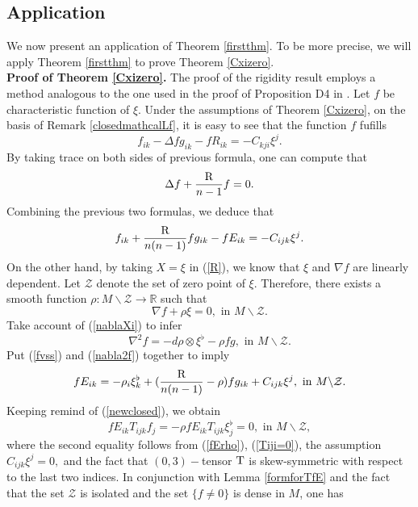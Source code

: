 \documentclass[10pt,leqno,oneside]{amsart}
\begin{document}
{   \subsection{Application}
          We now present an application of Theorem \ref{firstthm}. To be more precise, we will apply Theorem \ref{firstthm} to prove Theorem \ref{Cxizero}.\\
    {\bf Proof of Theorem \ref{Cxizero}.}
         The proof of the rigidity result employs a method analogous to the one used in the proof of Proposition D4 in \cite{Lafontaine1983}. Let $f$ be characteristic function of $\xi.$ Under the assumptions of Theorem \ref{Cxizero}, on the basis of Remark \ref{closedmathcalLf}, it is easy to see that the function $f$ fufills
         \[f_{ik}-\Delta f g_{ik}-f R_{ik}=-C_{kji}\xi^j.\]
         By taking trace on both sides of previous formula, one can compute that
         \[\Delta f+\frac{\rm{R}}{n-1}f=0.\]
         Combining the previous two formulas, we deduce that
         \begin{equation}\label{fvss}
           f_{ik}+  \frac{\rm{R}}{n(n-1)}fg_{ik}-f E_{ik}=-C_{ijk}\xi^j.
         \end{equation}
         On the other hand, by taking $X=\xi$ in (\ref{R}), we know that $\xi$ and $\nabla f$ are linearly dependent. Let $\mathcal{Z}$ denote the set of zero point of $\xi.$ Therefore, there exists a smooth function $\rho:M\backslash \mathcal{Z}\rightarrow\mathbb R$ such that
         \begin{equation}\label{newclosed}
                       \nabla f+\rho\xi=0,\text{~in~} M\backslash \mathcal{Z}.
         \end{equation}
         Take account of (\ref{nablaXi}) to infer
         \begin{equation}\label{nabla2f}
           \nabla^2f=-d\rho\otimes\xi^\flat-\rho fg,\text{~in~} M\backslash \mathcal{Z}.
         \end{equation}
         Put (\ref{fvss}) and (\ref{nabla2f}) together to imply
         \begin{equation}\label{fErho}
           fE_{ik}=-\rho_i\xi_k^\flat+(\frac{{\rm{R}}}{n(n-1)}-\rho)fg_{ik}+C_{ijk}\xi^j,\text{~in~} M\backslash \mathcal{Z}.
         \end{equation}
         Keeping remind of (\ref{newclosed}), we obtain
         \[fE_{ik}T_{ijk}f_{j}=-\rho fE_{ik}T_{ijk}\xi_{j}^\flat=0,\text{~in~} M\backslash \mathcal{Z},\]
         where the second equality follows from (\ref{fErho}), (\ref{Tiji=0}), the assumption $C_{ijk}\xi^j=0,$ and the fact that $(0,3)-$tensor ${\rm T}$ is skew-symmetric with respect to the last two indices. In conjunction with Lemma \ref{formforTfE} and the fact that the set $\mathcal{Z}$ is isolated and the set $\{f\neq0\}$ is dense in $M$, one has
}
\end{document}
